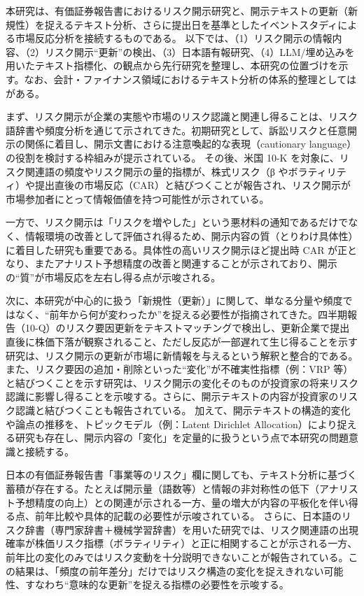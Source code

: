 本研究は、有価証券報告書におけるリスク開示研究と、開示テキストの更新（新規性）を捉えるテキスト分析、さらに提出日を基準としたイベントスタディによる市場反応分析を接続するものである。
以下では、（1）リスク開示の情報内容、（2）リスク開示“更新”の検出、（3）日本語有報研究、（4）LLM/埋め込みを用いたテキスト指標化、の観点から先行研究を整理し、本研究の位置づけを示す。なお、会計・ファイナンス領域におけるテキスト分析の体系的整理としては \cite{LoughranMcDonald2016} がある。

まず、リスク開示が企業の実態や市場のリスク認識と関連し得ることは、リスク語辞書や頻度分析を通じて示されてきた。初期研究として、訴訟リスクと任意開示の関係に着目し、開示文書における注意喚起的な表現（cautionary language）の役割を検討する枠組みが提示されている\cite{NelsonPritchard2007}。
その後、米国 10-K を対象に、リスク関連語の頻度やリスク開示の量的指標が、株式リスク（β やボラティリティ）や提出直後の市場反応（CAR）と結びつくことが報告され、リスク開示が市場参加者にとって情報価値を持つ可能性が示されている\cite{Campbell2014}。

一方で、リスク開示は「リスクを増やした」という悪材料の通知であるだけでなく、情報環境の改善として評価され得るため、開示内容の質（とりわけ具体性）に着目した研究も重要である。具体性の高いリスク開示ほど提出時 CAR が正となり、またアナリスト予想精度の改善と関連することが示されており、開示の“質”が市場反応を左右し得る点が示唆される\cite{HopeHuLu2016}。

次に、本研究が中心的に扱う「新規性（更新）」に関して、単なる分量や頻度ではなく、“前年から何が変わったか”を捉える必要性が指摘されてきた。四半期報告（10-Q）のリスク要因更新をテキストマッチングで検出し、更新企業で提出直後に株価下落が観察されること、ただし反応が一部遅れて生じ得ることを示す研究は、リスク開示の更新が市場に新情報を与えるという解釈と整合的である\cite{Filzen2015}。
また、リスク要因の追加・削除といった“変化”が不確実性指標（例：VRP 等）と結びつくことを示す研究は、リスク開示の変化そのものが投資家の将来リスク認識に影響し得ることを示唆する\cite{Lyle2023}。さらに、開示テキストの内容が投資家のリスク認識と結びつくことも報告されている\cite{KravetMuslu2013}。
加えて、開示テキストの構造的変化や論点の推移を、トピックモデル（例：Latent Dirichlet Allocation）により捉える研究も存在し、開示内容の「変化」を定量的に扱うという点で本研究の問題意識と接続する\cite{Dyer2017}。

日本の有価証券報告書「事業等のリスク」欄に関しても、テキスト分析に基づく蓄積が存在する。たとえば開示量（語数等）と情報の非対称性の低下（アナリスト予想精度の向上）との関連が示される一方、量の増大が内容の平板化を伴い得る点、前年比較や具体的記載の必要性が示唆されている\cite{Noda2016}。
さらに、日本語のリスク辞書（専門家辞書＋機械学習辞書）を用いた研究では、リスク関連語の出現確率が株価リスク指標（ボラティリティ）と正に相関することが示される一方、前年比の変化のみではリスク変動を十分説明できないことが報告されている\cite{SatoIkedaInoue2021}。この結果は、「頻度の前年差分」だけではリスク構造の変化を捉えきれない可能性、すなわち“意味的な更新”を捉える指標の必要性を示唆する。

